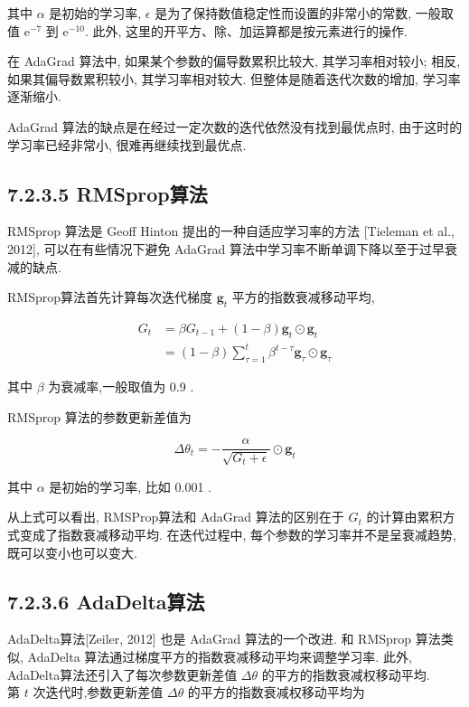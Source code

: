 \documentclass[10pt]{article}
\begin{document}
其中 $\alpha$ 是初始的学习率, $\epsilon$ 是为了保持数值稳定性而设置的非常小的常数, 一般取值 $\mathrm{e}^{-7}$ 到 $\mathrm{e}^{-10}$. 此外, 这里的开平方、除、加运算都是按元素进行的操作.

在 AdaGrad 算法中, 如果某个参数的偏导数累积比较大, 其学习率相对较小; 相反, 如果其偏导数累积较小, 其学习率相对较大. 但整体是随着迭代次数的增加, 学习率逐渐缩小.

AdaGrad 算法的缺点是在经过一定次数的迭代依然没有找到最优点时, 由于这时的学习率已经非常小, 很难再继续找到最优点.

\subsection*{7.2.3.5 RMSprop算法}
RMSprop 算法是 Geoff Hinton 提出的一种自适应学习率的方法 [Tieleman et al., 2012], 可以在有些情况下避免 AdaGrad 算法中学习率不断单调下降以至于过早衰减的缺点.

RMSprop算法首先计算每次迭代梯度 $\mathbf{g}_{t}$ 平方的指数衰减移动平均,


\begin{align*}
G_{t} & =\beta G_{t-1}+(1-\beta) \boldsymbol{g}_{t} \odot \boldsymbol{g}_{t}  \tag{7.16}\\
& =(1-\beta) \sum_{\tau=1}^{t} \beta^{t-\tau} \mathbf{g}_{\tau} \odot \mathbf{g}_{\tau} \tag{7.17}
\end{align*}


其中 $\beta$ 为衰减率,一般取值为 0.9 .

RMSprop 算法的参数更新差值为


\begin{equation*}
\Delta \theta_{t}=-\frac{\alpha}{\sqrt{G_{t}+\epsilon}} \odot \boldsymbol{g}_{t} \tag{7.18}
\end{equation*}


其中 $\alpha$ 是初始的学习率, 比如 0.001 .

从上式可以看出, RMSProp算法和 AdaGrad 算法的区别在于 $G_{t}$ 的计算由累积方式变成了指数衰减移动平均. 在迭代过程中, 每个参数的学习率并不是呈衰减趋势, 既可以变小也可以变大.

\subsection*{7.2.3.6 AdaDelta算法}
AdaDelta算法[Zeiler, 2012] 也是 AdaGrad 算法的一个改进. 和 RMSprop 算法类似, AdaDelta 算法通过梯度平方的指数衰减移动平均来调整学习率. 此外, AdaDelta算法还引入了每次参数更新差值 $\Delta \theta$ 的平方的指数衰减权移动平均.\\
第 $t$ 次迭代时,参数更新差值 $\Delta \theta$ 的平方的指数衰减权移动平均为
\end{document}
